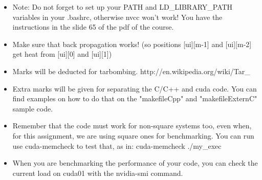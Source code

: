 \documentclass[a4paper, fleqn]{article}
\begin{document}
\begin{itemize}
        \item Note: Do not forget to set up your PATH and LD\_LIBRARY\_PATH variables in your .bashrc, otherwise nvcc won't work! You have the instructions in the slide 65 of the pdf of the course. 
        \item Make sure that back propagation works! (so positions [ui][m-1] and [ui][m-2] get heat from [ui][0] and [ui][1])
        \item Marks will be deducted for tarbombing. http://en.wikipedia.org/wiki/Tar\_%
        \item Extra marks will be given for separating the C/C++ and cuda code. You can find examples on how to do that on the "makefileCpp" and "makefileExternC" sample code.
        \item Remember that the code must work for non-square systems too, even when, for this assignment, we are using square ones for benchmarking. You can run use cuda-memcheck to test that, as in: cuda-memcheck ./my\_exec
        \item When you are benchmarking the performance of your code, you can check the current load on cuda01 with the nvidia-smi command.
\end{itemize}
\end{document}
